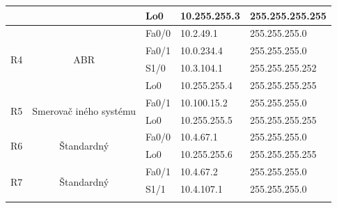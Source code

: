 \documentclass[12pt,twoside,a4paper]{report}
\begin{document}
\begin{table}[!htb]
\begin{tabular}{|c|c|l|l|l|}
                     &                                         & Lo0                                     & 10.255.255.3                            & 255.255.255.255                     \\ \hline
\multirow{4}{*}{R4}  & \multirow{4}{*}{ABR}                    & Fa0/0                                   & 10.2.49.1                               & 255.255.255.0                       \\ \cline{3-5} 
                     &                                         & Fa0/1                                   & 10.0.234.4                              & 255.255.255.0                       \\ \cline{3-5} 
                     &                                         & S1/0                                    & 10.3.104.1                              & 255.255.255.252                     \\ \cline{3-5} 
                     &                                         & Lo0                                     & 10.255.255.4                            & 255.255.255.255                     \\ \hline
\multirow{2}{*}{R5}  & \multirow{2}{*}{Smerovač iného systému} & Fa0/1                                   & 10.100.15.2                             & 255.255.255.0                       \\ \cline{3-5} 
                     &                                         & Lo0                                     & 10.255.255.5                            & 255.255.255.255                     \\ \hline
\multirow{2}{*}{R6}  & \multirow{2}{*}{Štandardný}             & Fa0/0                                   & 10.4.67.1                               & 255.255.255.0                       \\ \cline{3-5} 
                     &                                         & Lo0                                     & 10.255.255.6                            & 255.255.255.255                     \\ \hline
\multirow{3}{*}{R7}  & \multirow{3}{*}{Štandardný}             & Fa0/1                                   & 10.4.67.2                               & 255.255.255.0                       \\ \cline{3-5} 
                     &                                         & S1/1                                    & 10.4.107.1                              & 255.255.255.0                       \\ \cline{3-5} 

\end{tabular}
\end{table}
\end{document}
